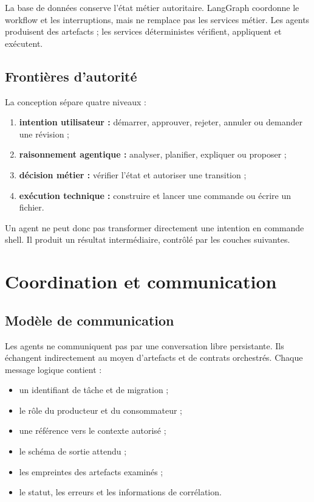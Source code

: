 La base de données conserve l'état métier autoritaire. LangGraph coordonne le workflow et les interruptions, mais ne remplace pas les services métier. Les agents produisent des artefacts ; les services déterministes vérifient, appliquent et exécutent.

\subsection{Frontières d'autorité}

La conception sépare quatre niveaux :

\begin{enumerate}
    \item \textbf{intention utilisateur :} démarrer, approuver, rejeter, annuler ou demander une révision ;
    \item \textbf{raisonnement agentique :} analyser, planifier, expliquer ou proposer ;
    \item \textbf{décision métier :} vérifier l'état et autoriser une transition ;
    \item \textbf{exécution technique :} construire et lancer une commande ou écrire un fichier.
\end{enumerate}

Un agent ne peut donc pas transformer directement une intention en commande shell. Il produit un résultat intermédiaire, contrôlé par les couches suivantes.

\section{Coordination et communication}

\subsection{Modèle de communication}

Les agents ne communiquent pas par une conversation libre persistante. Ils échangent indirectement au moyen d'artefacts et de contrats orchestrés. Chaque message logique contient :

\begin{itemize}
    \item un identifiant de tâche et de migration ;
    \item le rôle du producteur et du consommateur ;
    \item une référence vers le contexte autorisé ;
    \item le schéma de sortie attendu ;
    \item les empreintes des artefacts examinés ;
    \item le statut, les erreurs et les informations de corrélation.
\end{itemize}

